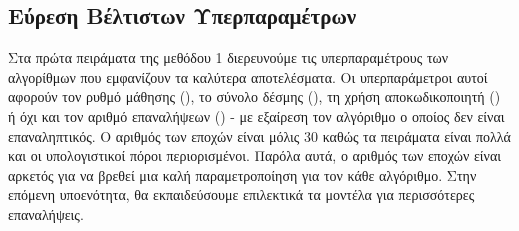 \subsection{Εύρεση Βέλτιστων Υπερπαραμέτρων}

Στα πρώτα πειράματα της μεθόδου 1 διερευνούμε τις υπερπαραμέτρους των αλγορίθμων που εμφανίζουν τα καλύτερα αποτελέσματα. Οι υπερπαράμετροι αυτοί αφορούν τον ρυθμό μάθησης (), το σύνολο δέσμης (), τη χρήση αποκωδικοποιητή () ή όχι και τον αριθμό επαναλήψεων () - με εξαίρεση τον αλγόριθμο  ο οποίος δεν είναι επαναληπτικός. Ο αριθμός των εποχών είναι μόλις 30 καθώς τα πειράματα είναι πολλά και οι υπολογιστικοί πόροι περιορισμένοι. Παρόλα αυτά, ο αριθμός των εποχών είναι αρκετός για να βρεθεί μια καλή παραμετροποίηση για τον κάθε αλγόριθμο. Στην επόμενη υποενότητα, θα εκπαιδεύσουμε επιλεκτικά τα μοντέλα για περισσότερες επαναλήψεις. 

